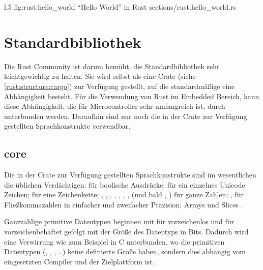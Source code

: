 \begin{wrapfigure}{l}{.5\textwidth}
	\rustcinclude
		{fig:rust:hello_world}
		{\enquote{Hello World} in Rust}
		{sections/rust.hello_world.rs}
\end{wrapfigure}




\clearpage

\section{Standardbibliothek}

Die Rust Community ist darum bemüht, die Standardbibliothek sehr leichtgewichtig zu halten.
Sie wird selbst als eine Crate (siehe \autoref{rust:structure:cargo}) zur Verfügung gestellt, auf die standardmäßige eine Abhängigkeit besteht.
Für die Verwendung von Rust im Embedded Bereich, kann diese Abhängigkeit, die für Microcontroller sehr umfangreich ist, durch \rustcinline{#![no_std]} unterbunden werden.
Daraufhin sind nur noch die in der  Crate zur Verfügung gestellten Sprachkonstrukte verwendbar.

\subsection{core}
\label{rust:core}
Die in der  Crate zur Verfügung gestellten Sprachkonstrukte sind im wesentlichen die üblichen  Verdächtigen:  für boolische Ausdrücke;  für ein einzelnes Unicode Zeichen;  für eine Zeichenkette; , , , , , , ,  (und bald ,  ) für ganze Zahlen; ,  für Fließkommazahlen in einfacher und zweifacher Präzision; Arrays und Slices \cite{rust:book:primitives}.

Ganzzahlige primitive Datentypen beginnen mit  für vorzeichenlos und  für vorzeichenbehaftet gefolgt mit der Größe des Datentyps in Bits.
Dadurch wird eine Verwirrung wie zum Beispiel in C unterbunden, wo die primitiven Datentypen (, , , ..) keine definierte Größe haben, sondern dies abhängig vom eingesetzten Compiler und der Zielplattform ist. 

